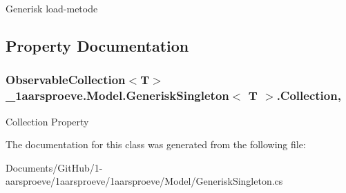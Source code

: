 Generisk load-\/metode 



\subsection{Property Documentation}
\hypertarget{class__1aarsproeve_1_1_model_1_1_generisk_singleton_a350a2fb273daada34ad4fab80105b543}{}
\subsubsection[{Collection}]{\setlength{\rightskip}{0pt plus 5cm}Observable\+Collection$<$T$>$ {\bf \+\_\+1aarsproeve.\+Model.\+Generisk\+Singleton}$<$ T $>$.Collection\hspace{0.3cm}{\ttfamily [get]}, {\ttfamily [set]}}\label{class__1aarsproeve_1_1_model_1_1_generisk_singleton_a350a2fb273daada34ad4fab80105b543}


Collection Property 



The documentation for this class was generated from the following file\+:\begin{DoxyCompactItemize}
\item 
Documents/\+Git\+Hub/1-\/aarsproeve/1aarsproeve/1aarsproeve/\+Model/Generisk\+Singleton.\+cs\end{DoxyCompactItemize}
